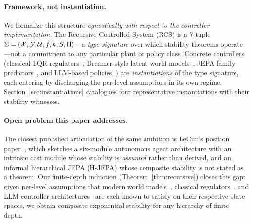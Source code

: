 \documentclass[conference]{IEEEtran}
\begin{document}
\paragraph{Framework, not instantiation.}
We formalize this structure \emph{agnostically with respect to the
controller implementation}.  The Recursive Controlled System (RCS) is a
7-tuple $\Sigma = (\mathcal{X}, \mathcal{Y}, \mathcal{U}, f, h, S, \Pi)$---a
\emph{type signature} over which stability theorems
operate---not a commitment to any particular plant or policy class.
Concrete controllers (classical LQR
regulators~\cite{khalil2002nonlinear}, Dreamer-style latent world
models~\cite{hafner2025dreamerv3}, JEPA-family
predictors~\cite{assran2025vjepa2}, and LLM-based
policies~\cite{bhargava2023magic,soatto2023taming}) are
\emph{instantiations} of the type signature, each entering by
discharging the per-level assumptions in its own regime.
Section~\ref{sec:instantiations} catalogues four representative
instantiations with their stability witnesses.

\paragraph{Open problem this paper addresses.}
The closest published articulation of the same ambition is LeCun's
position paper~\cite{lecun2022path}, which sketches a six-module
autonomous agent architecture with an intrinsic cost module whose
stability is \emph{assumed} rather than derived, and an informal
hierarchical JEPA (H-JEPA) whose composite stability is not stated as a
theorem.  Our finite-depth induction (Theorem~\ref{thm:recursive})
closes this gap: given per-level assumptions that modern world
models~\cite{hafner2025dreamerv3,assran2025vjepa2}, classical
regulators~\cite{khalil2002nonlinear}, and LLM controller
architectures~\cite{bhargava2023magic,soatto2023taming,wang2026agentspec}
are each known to satisfy on their respective state spaces, we obtain
composite exponential stability for any hierarchy of finite depth.
\end{document}
